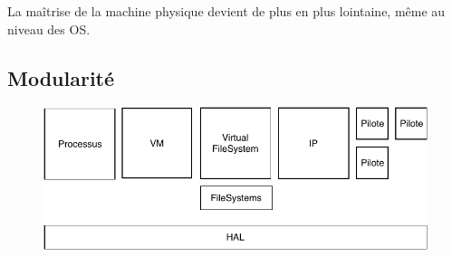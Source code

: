 \documentclass[11pt]{article}
\begin{document}
La maîtrise de la machine physique devient de plus en plus lointaine, même au niveau des OS.

\subsection{Modularité}
\begin{figure}
    \centering
    \includegraphics{img/modular-os.pdf}
\end{figure}
\end{document}
